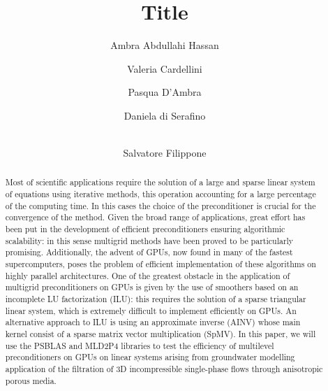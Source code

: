 \documentclass[runningheads,a4paper]{llncs}
\newcommand{\keywords}[1]{\par\addvspace\baselineskip
\noindent\keywordname\enspace\ignorespaces#1}
\begin{document}
\mainmatter  %

\title{Title}



%
%
\author{Ambra Abdullahi Hassan%
\and Valeria Cardellini\and Pasqua D'Ambra\and Daniela di Serafino\and\\
Salvatore Filippone}
%



%
%

\maketitle


\begin{abstract}
Most of scientific applications require the solution of a large and sparse linear system of equations using iterative methods, this operation accounting for a large percentage of the computing time. In this cases the choice of the preconditioner is crucial for the convergence of the method.
Given the broad range of applications, great effort has been put in the development of efficient  preconditioners ensuring algorithmic scalability: in this sense multigrid methods have been proved to be particularly promising.
Additionally, the advent of GPUs, now found in many of the fastest supercomputers, poses the problem of efficient implementation of these algorithms on highly parallel architectures. 
One of the greatest obstacle in the application of multigrid preconditioners on GPUs is given by the use of smoothers based on an incomplete LU factorization (ILU): this requires the solution of a sparse triangular linear system, which is extremely difficult to implement efficiently on GPUs. An alternative approach to ILU is using an approximate inverse (AINV) whose main kernel consist of a sparse matrix vector multiplication (SpMV). 
In this paper, we will use the PSBLAS and MLD2P4 libraries to test the efficiency of multilevel preconditioners on GPUs on linear systems arising from groundwater modelling application of the filtration of 3D incompressible single-phase flows through anisotropic porous media.
\keywords{}
\end{abstract}
\end{document}
